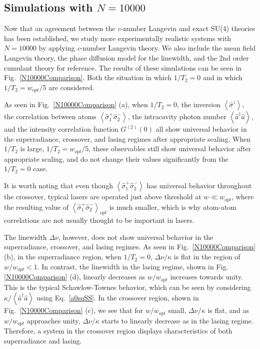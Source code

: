 \documentclass[aps,
twocolumn,
superscriptaddress,groupedaddress]{revtex4}
\begin{document}
\subsection{Simulations with $N=10000$}

Now that an agreement between the {\it c}-number Langevin and exact SU(4)
theories has been established, we study more experimentally realistic
systems with $N=10000$ by applying {\it c}-number Langevin theory. We also
include the mean field Langevin theory, the phase diffusion model for the linewidth, and the 2nd order cumulant theory for
reference. The results of these simulations can be seen in
Fig.~\ref{N10000Comparison}. Both the situation in which $1/T_2=0$ and
in which $1/T_2=w_{opt}/5$ are considered.

As seen in Fig.~\ref{N10000Comparison} (a), when $1/T_2=0$, the
inversion $\left<\hat{\sigma}^{z}\right>$, the correlation between atoms
$\left<\hat{\sigma}_{1}^{+} \hat{\sigma}_{2}^{-}\right>$, the
intracavity photon number  $\left<\hat{a}^{\dagger}\hat{a}\right>$,  and
the intensity correlation function $G^{(2)}(0)$ all show universal
behavior in the superradiance, crossover, and lasing regimes after
appropriate scaling. When $1/T_2$ is large, $1/T_2=w_{opt}/5$, these
observables still show universal behavior after appropriate scaling, and
do not change their values significantly from the $1/T_2=0$ case.

It is worth noting that even though  $\left<\hat{\sigma}_{1}^{+}
\hat{\sigma}_{2}^{-}\right>$ has universal behavior throughout the
crossover, typical lasers are operated just above threshold at $w \ll
w_{opt}$, where the resulting value of
$\left<\hat{\sigma}_{1}^{+}\hat{\sigma}_{2}^{-}\right>_{opt}$ is much
smaller, which is why atom-atom correlations are not usually thought to
be important in lasers.

The linewidth $\Delta \nu$, however, does not show universal behavior in the superradiance, crossover, and lasing regimes. As seen in Fig.~\ref{N10000Comparison} (b), in the superradiance region, when $1/T_2=0$, $\Delta \nu / \kappa$ is flat in the region of $w/w_{opt}<1$. In contrast, the linewidth in the lasing regime, shown in Fig.\ref{N10000Comparison} (d), linearly decreases as $w/w_{opt}$ increases towards unity. This is the typical Schawlow-Townes behavior, which can be seen by considering $\kappa/\left<\hat{a}^{\dagger}\hat{a}\right>$ using Eq.~\ref{a0sqSS}. In the crossover region, shown in Fig.~\ref{N10000Comparison} (c), we see that for $w/w_{opt}$ small, $\Delta \nu/\kappa$ is flat, and as $w/w_{opt}$ approaches unity, $\Delta \nu/\kappa$ starts to linearly decrease as in the lasing regime. Therefore, a system in the crossover region displays characteristics of both superradiance and lasing. 
\end{document}
